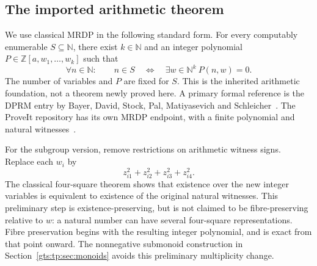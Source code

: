 \documentclass[11pt,letterpaper]{article}
\theoremstyle{definition}
\theoremstyle{remark}
\newcommand{\ZZ}{\mathbb Z}
\newcommand{\NN}{\mathbb N}
\begin{document}
\subsection{The imported arithmetic theorem}
We use classical MRDP in the following standard form. For every computably
enumerable $S\subseteq\NN$, there exist $k\in\NN$ and an integer polynomial
$P\in\ZZ[a,w_1,\ldots,w_k]$ such that
\begin{equation}\label{gts:tp:eq:mrdp}
 \forall n\in\NN:\qquad
 n\in S\quad\Longleftrightarrow\quad
 \exists w\in\NN^k\ P(n,w)=0.
\end{equation}
The number of variables and $P$ are fixed for $S$. This is the inherited
arithmetic foundation, not a theorem newly proved here. A primary formal
reference is the DPRM entry by Bayer, David, Stock, Pal, Matiyasevich and
Schleicher~\cite{AFP}. The ProveIt repository has its own MRDP endpoint,
with a finite polynomial and natural witnesses~\cite{ProveIt}.

For the subgroup version, remove restrictions on arithmetic witness signs.
Replace each $w_i$ by
\[
                    z_{i1}^2+z_{i2}^2+z_{i3}^2+z_{i4}^2.
\]
The classical four-square theorem shows that existence over the new integer
variables is equivalent to existence of the original natural witnesses.
This preliminary step is existence-preserving, but is not claimed to be
fibre-preserving relative to $w$: a natural number can have several
four-square representations. Fibre preservation begins with the resulting
integer polynomial, and is exact from that point onward. The nonnegative
submonoid construction in Section~\ref{gts:tp:sec:monoids} avoids this preliminary
multiplicity change.
\end{document}
